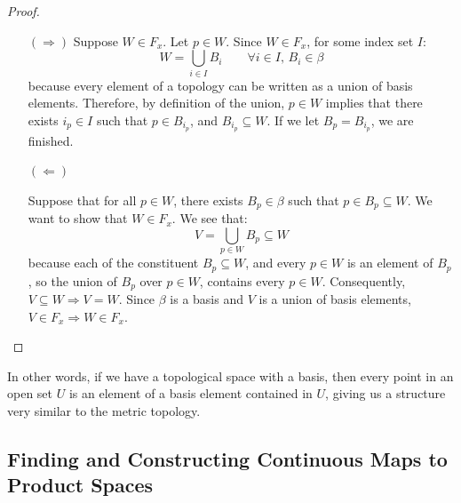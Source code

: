 \begin{proof}
\begin{itemize}
\item[$(\Rightarrow)$]
Suppose $W\in F_x$. Let $p\in W$. Since $W\in F_x$, for some index set $I$:
\[W = \bigcup_{i\in I}B_i \qquad \forall i\in I,\,B_i\in \beta\]
because every element of a topology can be written as a union of basis elements.
Therefore, by definition of the union, $p\in W$ implies that there exists $i_p\in I$ such that $p\in B_{i_p}$, and $B_{i_p}\subseteq W$. If we let $B_p = B_{i_p}$, we are finished.

\item[$(\Leftarrow)$]

Suppose that for all $p\in W$, there exists $B_p\in \beta$ such that $p\in B_p\subseteq W$. We want to show that $W\in F_x$. We see that:
\[V = \bigcup_{p\in W}B_p\subseteq W\]
because each of the constituent $B_p\subseteq W$, and every $p\in W$ is an element of $B_p$, so the union of $B_p$ over $p\in W$, contains every $p\in W$. Consequently, $V\subseteq W \Rightarrow V=W$. Since $\beta$ is a basis and $V$ is a union of basis elements, $V\in F_x \Rightarrow W\in F_x$. 
\end{itemize}
\end{proof}


In other words, if we have a topological space with a basis, then every point in an open set $U$ is an element of a basis element contained in $U$, giving us a structure very similar to the metric topology.

\subsection{Finding and Constructing Continuous Maps to Product Spaces}

